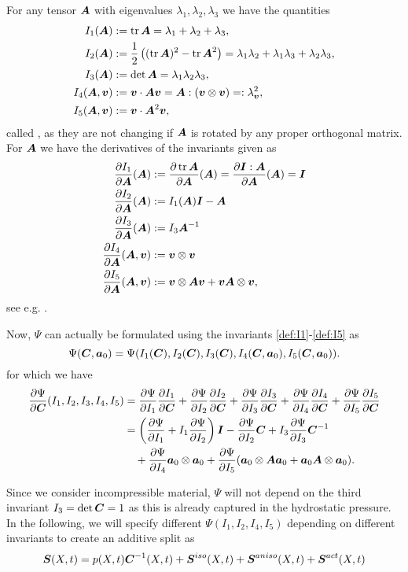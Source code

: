 For any tensor $\vA$ with eigenvalues $\lambda_1,\lambda_2,\lambda_3$ we have the quantities
\begin{align}
	I_1(\vA) &:= \tr\vA = \lambda_1 + \lambda_2 + \lambda_3,\label{def:I1}\\
	I_2(\vA) &:= \frac{1}{2}\left((\tr \vA)^2 - \tr\vA^2\right) = \lambda_1\lambda_2 + \lambda_1\lambda_3 + \lambda_2\lambda_3,\\
	I_3(\vA) &:= \det\vA = \lambda_1\lambda_2\lambda_3,\label{def:I3}\\
	I_4(\vA,\vv) &:= \vv\cdot\vA\vv = \vA : (\vv \otimes \vv)\label{def:I4} =: \lambda^2_{\vv},\\
	I_5(\vA,\vv) &:= \vv\cdot\vA^2\vv,\label{def:I5}
\end{align}
called , as they are not changing if $\vA$ is rotated by any proper orthogonal matrix.
For  $\vA$ we have the derivatives of the invariants given as
\begin{align}
	\d{I_1}{\vA}(\vA) &:= \d{\tr\vA}{\vA}(\vA) = \d{\vI:\vA}{\vA}(\vA) = \vI\\
	\d{I_2}{\vA}(\vA) &:= I_1(\vA)\vI - \vA\\
	\d{I_3}{\vA}(\vA) &:= I_3\vA^{-1}\\
	\d{I_4}{\vA}(\vA,\vv) &:= \vv \otimes \vv\label{def:dI4}\\
	\d{I_5}{\vA}(\vA,\vv) &:= \vv \otimes \vA\vv + \vv\vA \otimes \vv,
\end{align}
see e.g. \cite[p.216/p.268]{Holzapfel2000}.

Now, $\Psi$ can actually be formulated using the invariants \eqref{def:I1}-\eqref{def:I5} as
\[
	\Psi(\vC,\va_0) = \Psi(I_1(\vC),I_2(\vC),I_3(\vC),I_4(\vC,\va_0),I_5(\vC,\va_0)).
\]
for which we have
\begin{align}
	\d{\Psi}{\vC}(I_1,I_2,I_3,I_4,I_5) &=
		\d{\Psi}{I_1}\d{I_1}{\vC} + \d{\Psi}{I_2}\d{I_2}{\vC} + \d{\Psi}{I_3}\d{I_3}{\vC} + \d{\Psi}{I_4}\d{I_4}{\vC} + \d{\Psi}{I_5}\d{I_5}{\vC}\\
		&= \left(\d{\Psi}{I_1} + I_1\d{\Psi}{I_2}\right)\vI - \d{\Psi}{I_2}\vC + I_3\d{\Psi}{I_3}\vC^{-1}\\
		&\quad+ \d{\Psi}{I_4}\va_0\otimes\va_0 + \d{\Psi}{I_5}(\va_0\otimes\vA\va_0 + \va_0\vA\otimes\va_0).
\end{align}

Since we consider incompressible material, $\Psi$ will not depend on the third invariant $I_3 = \det\vC = 1$ as this is already captured in the hydrostatic pressure. 
In the following, we will specify different $\Psi(I_1,I_2,I_4,I_5)$ depending on different invariants to create an additive split as 
\begin{align}
	\vS(X,t) = p(X,t)\vC^{-1}(X,t) + \vSi(X,t) + \vSa(X,t) + \vSf(X,t)\label{def:S_split}
\end{align}

